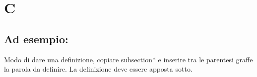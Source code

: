 \section*{C}
\markright{}
\subsection*{Ad esempio:}
Modo di dare una definizione, copiare subsection*{} e inserire tra le parentesi graffe la parola da definire. La definizione deve essere apposta sotto.
